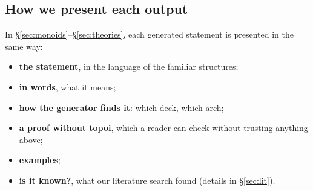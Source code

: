\subsection{How we present each output}

In \S\ref{sec:monoids}--\S\ref{sec:theories}, each generated statement is presented in the same way:
\begin{itemize}
\item \textbf{the statement}, in the language of the familiar structures;
\item \textbf{in words}, what it means;
\item \textbf{how the generator finds it}: which deck, which arch;
\item \textbf{a proof without topoi}, which a reader can check without trusting anything above;
\item \textbf{examples};
\item \textbf{is it known?}, what our literature search found (details in \S\ref{sec:lit}).
\end{itemize}
